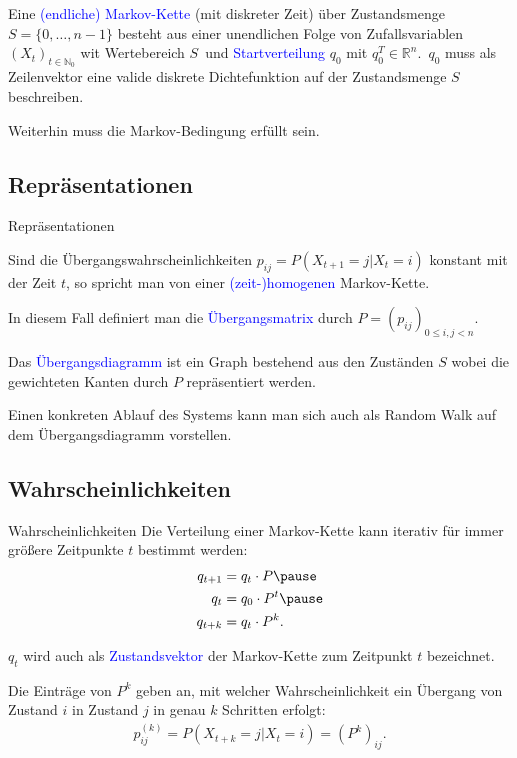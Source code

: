 \documentclass{beamer}
\def\padding{\vspace{0.5cm}}
\def\spadding{\vspace{0.25cm}}
\def\b{\textcolor{blue}}
\begin{document}
\begin{frame}
    \begin{definition}
        Eine \b{(endliche) Markov-Kette} (mit diskreter Zeit) über Zustandsmenge $S = \{0, \dots, n-1\}$ besteht aus einer unendlichen Folge von Zufallsvariablen $(X_t)_{t \in \mathbb{N}_0}$ wit Wertebereich $S$\pause\ und \b{Startverteilung} $q_0$ mit $q_0^T \in \mathbb{R}^n$.\pause\ $q_0$ muss als Zeilenvektor eine valide diskrete Dichtefunktion auf der Zustandsmenge $S$ beschreiben.\pause\par
        Weiterhin muss die Markov-Bedingung erfüllt sein.
    \end{definition}
\end{frame}

\subsection{Repräsentationen}
\begin{frame}{Repräsentationen}
    \begin{definition}
        Sind die Übergangswahrscheinlichkeiten $p_{ij} = P(X_{t+1} = j | X_t = i)$ konstant mit der Zeit $t$, so spricht man von einer \b{(zeit-)homogenen} Markov-Kette.\par\pause\spadding
        In diesem Fall definiert man die \b{Übergangsmatrix} durch $P = (p_{ij})_{0 \leq i, j < n}$.\par\pause\spadding
        Das \b{Übergangsdiagramm} ist ein Graph bestehend aus den Zuständen $S$ wobei die gewichteten Kanten durch $P$ repräsentiert werden.
    \end{definition}\par\pause\padding
    Einen konkreten Ablauf des Systems kann man sich auch als Random Walk auf dem Übergangsdiagramm vorstellen.
\end{frame}

\subsection{Wahrscheinlichkeiten}
\begin{frame}{Wahrscheinlichkeiten}
    Die Verteilung einer Markov-Kette kann iterativ für immer größere Zeitpunkte $t$ bestimmt werden:
    \begin{align*}
        q_{t+1} &= q_t \cdot P\pause \\
        q_t     &= q_0 \cdot P^t\pause \\
        q_{t+k} &= q_t \cdot P^k.
    \end{align*}\pause
    \begin{definition}
        $q_t$ wird auch als \b{Zustandsvektor} der Markov-Kette zum Zeitpunkt $t$ bezeichnet.
    \end{definition}\par\pause\padding
    Die Einträge von $P^k$ geben an, mit welcher Wahrscheinlichkeit ein Übergang von Zustand $i$ in Zustand $j$ in genau $k$ Schritten erfolgt:
    \begin{align*}
        p_{ij}^{(k)} = P(X_{t+k} = j | X_t = i) = (P^k)_{ij}.
    \end{align*}
\end{frame}
\end{document}
